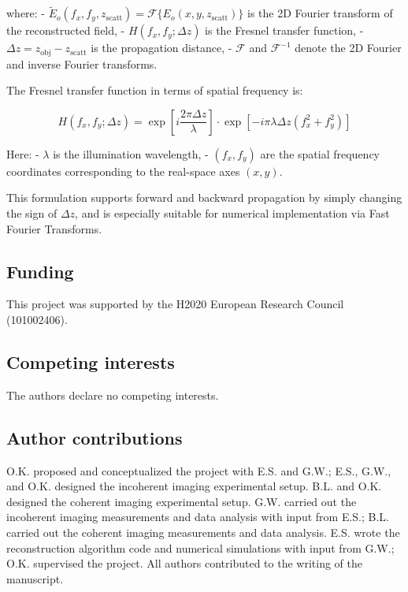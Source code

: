 \documentclass[pdflatex,sn-mathphys-num]{sn-jnl}%
\theoremstyle{thmstyleone}%
\theoremstyle{thmstyletwo}%
\theoremstyle{thmstylethree}%
\begin{document}
where:
- $ \tilde{E}_o(f_x, f_y, z_{\text{scatt}}) = \mathcal{F}\{ E_o(x, y, z_{\text{scatt}}) \} $ is the 2D Fourier transform of the reconstructed field,
- $ H(f_x, f_y; \Delta z) $ is the Fresnel transfer function,
- $ \Delta z = z_{\text{obj}} - z_{\text{scatt}} $ is the propagation distance,
- $ \mathcal{F} $ and $ \mathcal{F}^{-1} $ denote the 2D Fourier and inverse Fourier transforms.

The Fresnel transfer function in terms of spatial frequency is:

\begin{equation}
    H(f_x, f_y; \Delta z) = \exp\left[ i \frac{2\pi \Delta z}{\lambda} \right] \cdot \exp\left[ -i \pi \lambda \Delta z (f_x^2 + f_y^2) \right]
\end{equation}

Here:
- $ \lambda $ is the illumination wavelength,
- $ (f_x, f_y) $ are the spatial frequency coordinates corresponding to the real-space axes $ (x, y) $.

This formulation supports forward and backward propagation by simply changing the sign of $ \Delta z $, and is especially suitable for numerical implementation via Fast Fourier Transforms.

\newpage


\subsection*{Funding}
\noindent This project was supported by the H2020 European Research Council (101002406).
\subsection*{Competing interests}
\noindent The authors declare no competing interests.
\subsection*{Author contributions}
O.K. proposed and conceptualized the project with E.S. and G.W.; E.S., G.W., and O.K. designed the incoherent imaging experimental setup. B.L. and O.K. designed the coherent imaging experimental setup. G.W. carried out the incoherent imaging measurements and data analysis with input from E.S.; B.L. carried out the coherent imaging measurements and data analysis. E.S. wrote the reconstruction algorithm code and numerical simulations with input from G.W.; O.K. supervised the project. All authors contributed to the writing of the manuscript.
\end{document}
